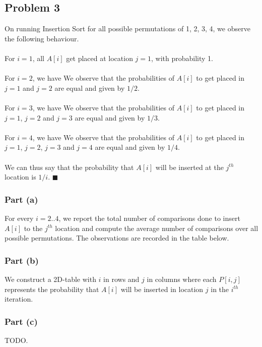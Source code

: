 \documentclass{article}
\begin{document}
\subsection{Problem 3}
On running Insertion Sort for all possible permutations of 1, 2, 3, 4, we observe the following behaviour.\\~\\
For $i=1$, all $A[i]$ get placed at location $j=1$, with probability 1.\\~\\
For $i=2$, we have
We observe that the probabilities of $A[i]$ to get placed in $j=1$ and $j=2$ are equal and given by $1/2$.\\~\\
For $i=3$, we have
We observe that the probabilities of $A[i]$ to get placed in $j=1$, $j=2$ and $j=3$ are equal and given by $1/3$.\\~\\
For $i=4$, we have
We observe that the probabilities of $A[i]$ to get placed in $j=1$, $j=2$, $j=3$ and $j=4$ are equal and given by $1/4$.\\\\
We can thus say that the probability that $A[i]$ will be inserted at the $j^{th}$ location is $1/i$. $\blacksquare$
\subsubsection{Part (a)}
For every $i=2..4$, we report the total number of comparisons done to insert $A[i]$ to the $j^{th}$ location and compute the average number of comparisons over all possible permutations. The observations are recorded in the table below.
\subsubsection{Part (b)}
We construct a 2D-table with $i$ in rows and $j$ in columns where each $P[i,j]$ represents the probability that $A[i]$ will be inserted in location $j$ in the $i^{th}$ iteration.
\subsubsection{Part (c)}
TODO.
\end{document}
